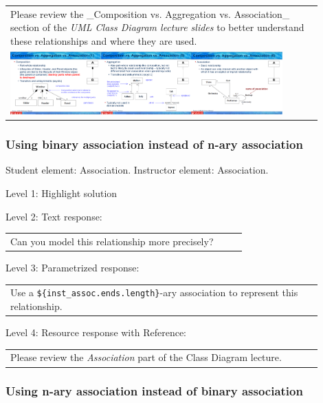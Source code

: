 \begin{tabular}{|p{0.9\linewidth}}
Please review the _Composition vs. Aggregation vs. Association_ section of 
the \textit{UML Class Diagram lecture slides} to 
better understand these relationships and where they are used.

\\
\includegraphics[width=0.9\textwidth]{images/composition_aggregation_association.png}
\end{tabular} \medskip


\subsubsection{Using binary association instead of n-ary association}

Student element: Association. Instructor element: Association. \medskip

\noindent Level 1: Highlight solution  \medskip

\noindent Level 2: Text response: \medskip

\begin{tabular}{|p{0.9\linewidth}}
Can you model this relationship more precisely?
\end{tabular} \medskip

\noindent Level 3: Parametrized response: \medskip

\begin{tabular}{|p{0.9\linewidth}}
Use a \verb|${inst_assoc.ends.length}|-ary association to represent this relationship.
\end{tabular} \medskip

\noindent Level 4: Resource response with Reference: \medskip

\begin{tabular}{|p{0.9\linewidth}}
Please review the \textit{Association} part of the Class Diagram lecture.
\end{tabular} \medskip


\subsubsection{Using n-ary association instead of binary association}


